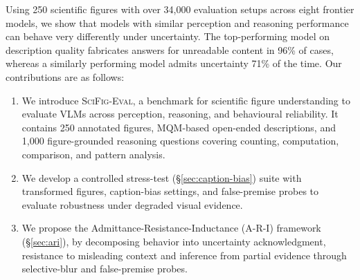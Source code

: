 Using 250 scientific figures with over 34,000 evaluation setups  across eight frontier models, we show that models with similar perception and reasoning performance can behave very differently under uncertainty. The top-performing model on description quality fabricates answers for unreadable content in 96\% of cases, whereas a similarly performing model admits uncertainty 71\% of the time. Our contributions are as follows:




\begin{enumerate}[label=(\roman*)]
    \item We introduce \textsc{SciFig-Eval}, a benchmark for scientific figure understanding to evaluate VLMs across perception, reasoning, and behavioural reliability. It contains 250 annotated figures, MQM-based open-ended descriptions, and 1,000 figure-grounded reasoning questions covering counting, computation, comparison, and pattern analysis.

    \item We develop a controlled stress-test 
    (\S\ref{sec:caption-bias})
    suite with transformed figures, caption-bias settings, and false-premise probes to evaluate robustness under degraded visual evidence.

    \item We propose the Admittance-Resistance-Inductance (A-R-I) framework (\S\ref{sec:ari}), by decomposing behavior into uncertainty acknowledgment, resistance to misleading context and inference from partial evidence through selective-blur and false-premise probes.
\end{enumerate}
